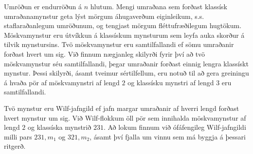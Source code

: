 Umröðun er endurröðun á \(n\) hlutum. Mengi umraðana sem forðast klassísk
umraðanamynstur geta lýst mörgum áhugaverðum eiginleikum, s.s. staflaraðanlegum
umröðunum, og tengjast mörgum fléttufræðilegum hugtökum. Möskvamynstur eru
útvíkkun á klassískum mynsturum sem leyfa auka skorður á tilvik mynstursins. Tvö
möskvamynstur eru samtilfallandi ef sömu umraðanir forðast hvert um sig. Við
finnum nægjanleg skilyrði fyrir því að tvö möskvamynstur séu samtilfallandi,
þegar umraðanir forðast einnig lengra klassískt mynstur. Þessi skilyrði, ásamt
tveimur sértilfellum, eru notuð til að gera greiningu á hvaða pör af
möskvamynstri af lengd \(2\) og klassísku mynstri af lengd \(3\) eru
samtilfallandi.

Tvö mynstur eru Wilf-jafngild ef jafn margar umraðanir af hverri lengd forðast
hvert mynstur um sig. Við Wilf-flokkum öll pör sem innihalda möskvamynstur af
lengd \(2\) og klassíska mynstrið \(231\). Að lokum finnum við ófáfengileg
Wilf-jafngildi milli pars \(231,m_1\) og \(321,m_2\), ásamt því fjalla um vinnu
sem má byggja á þessari ritgerð.
